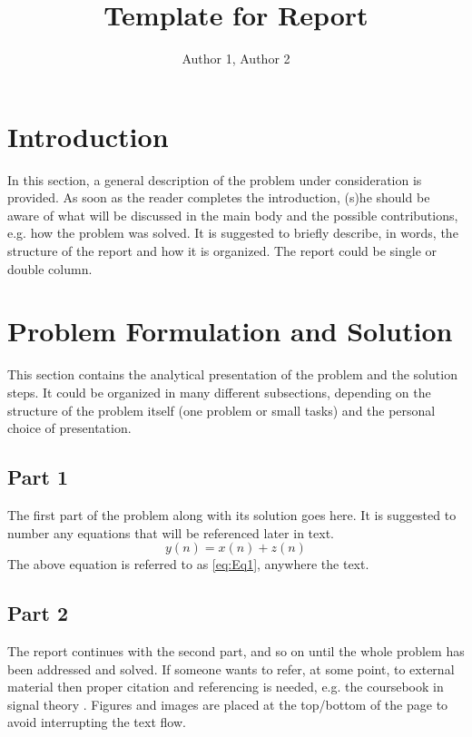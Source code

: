 \documentclass[twocolumn, 12pt]{IEEEtran}
\begin{document}
\title{Template for Report}
\author{Author 1, Author 2}

\maketitle

\section{Introduction}
In this section, a general description of the problem under consideration is provided. 
As soon as the reader completes the introduction, (s)he should be aware of what will 
be discussed in the main body and the possible contributions, e.g. how the problem was 
solved. It is suggested to briefly describe, in words, the structure of the report and 
how it is organized. The report could be single or double column.

\section{Problem Formulation and Solution}
This section contains the analytical presentation of the problem and the solution steps. 
It could be organized in many different subsections, depending on the structure of the 
problem itself (one problem or small tasks) and the personal choice of presentation.

\subsection{Part 1}
The first part of the problem along with its solution goes here. It is suggested to number 
any equations that will be referenced later in text.
\begin{equation} \label{eq:Eq1}
y(n)=x(n)+z(n)
\end{equation}
The above equation is referred to as \eqref{eq:Eq1}, anywhere the text. 

\subsection{Part 2}
The report continues with the second part, and so on until the whole problem has been 
addressed and solved. If someone wants to refer, at some point, to external material 
then proper citation and referencing is needed, e.g. the coursebook in signal theory 
\cite{HanOttHjalm}. Figures and images are placed at the top/bottom of the page to 
avoid interrupting the text flow.
\end{document}
